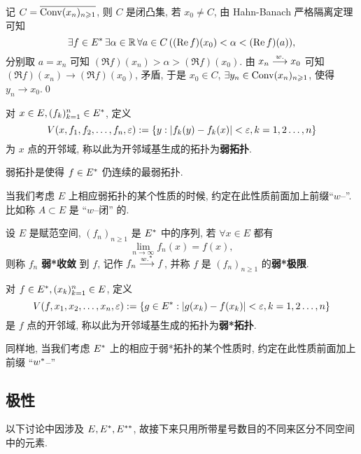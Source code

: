 	\begin{Proof}
		记 $ C = \overline{\operatorname{Conv}(x_{n})_{n\geqslant1}} $, 则 $ C $ 是闭凸集, 若 $ x_{0}\ne C $, 由 Hahn-Banach 严格隔离定理可知
		\[
			\exists f\in E^{*}\,\exists\alpha\in\mathbb{R}\,\forall a\in C\,((\mathrm{Re\,} f)(x_{0})<\alpha<(\mathrm{Re\,} f)(a)),
		\]
		分别取 $ a=x_{n} $ 可知 $ (\Re f)(x_{n})>\alpha>(\Re f)(x_{0}) $. 由 $ x_{n}\overset{w.}{\longrightarrow} x_{0} $ 可知 $ (\Re f)(x_{n})\to (\Re f)(x_{0}) $, 矛盾, 于是 $ x_{0}\in C $, $ \exists y_{n}\in\operatorname{Conv}(x_{n})_{n\geqslant1} $, 使得 $ y_{n}\to x_{0} $.\qed
	\end{Proof}
	\begin{Definition}[弱拓扑]\label{def:弱拓扑}
		对 $ x\in E, (f_{k})_{k=1}^{n}\in E^{*} $, 定义
		\[
			V(x, f_{1}, f_{2}, \dots, f_{n}, \varepsilon):=\{ y:\left| f_{k}(y)-f_{k}(x) \right| <\varepsilon, k=1, 2\dots, n \}
		\]
		为 $ x $ 点的开邻域, 称以此为开邻域基生成的拓扑为\textbf{弱拓扑}.
	\end{Definition}
	\begin{Remark}
		弱拓扑是使得 $ f\in E^{*} $ 仍连续的最弱拓扑.
	\end{Remark}
	\begin{Remark}
		当我们考虑 $ E $ 上相应弱拓扑的某个性质的时候, 约定在此性质前面加上前缀``$ w $--''. 比如称 $ A\subset E $ 是 ``$ w $--闭'' 的.
	\end{Remark}

	\begin{Definition}[弱*收敛]\label{def:弱*收敛}
		设 $ E $ 是赋范空间, $ (f_{n})_{n\geqslant1} $ 是 $ E^{*} $ 中的序列, 若 $ \forall x\in E $ 都有
		\[
			\lim_{n\to\infty}f_{n}(x)=f(x),
		\]
		则称 $ f_{n} $ \textbf{弱*收敛} 到 $ f $, 记作 $ f_{n}\overset{w.^{*}}{\longrightarrow} f $, 并称 $ f $ 是 $ (f_{n})_{n\geqslant1} $ 的\textbf{弱*极限}.
	\end{Definition}
	\begin{Definition}[弱*拓扑]\label{def:弱*拓扑}
		对 $ f\in E^{*}, (x_{k})_{k=1}^{n}\in E $, 定义
		\[
			V(f, x_{1}, x_{2}, \dots, x_{n}, \varepsilon):=\{ g\in E^{*}:\left| g(x_{k})-f(x_{k}) \right| <\varepsilon, k=1, 2\dots, n \}
		\]
		是 $ f $ 点的开邻域, 称以此为开邻域基生成的拓扑为\textbf{弱*拓扑}.
	\end{Definition}
	\begin{Remark}
		同样地, 当我们考虑 $ E^{*} $ 上的相应于弱*拓扑的某个性质时, 约定在此性质前面加上前缀 ``$w^{*}$--''
	\end{Remark}


	\subsection{极性}
	以下讨论中因涉及 $ E, E^{*}, E^{**} $, 故接下来只用所带星号数目的不同来区分不同空间中的元素.
	
